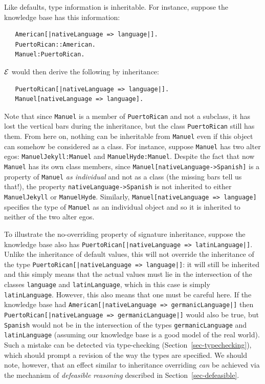 \documentclass[11pt]{article}
\newcommand{\ERGO}{\mbox{\ensuremath{\cal{E}}\smaller{{\sc{RGO}}}}\xspace}
\newcommand{\FLSYSTEM}{\ERGO}
\begin{document}
Like defaults,
type information is inheritable. For instance, suppose the knowledge base
has this information:
\begin{verbatim}
   American[|nativeLanguage => language|].
   PuertoRican::American.
   Manuel:PuertoRican.
\end{verbatim}
\FLSYSTEM would then derive the following by inheritance:
\begin{verbatim}
   PuertoRican[|nativeLanguage => language|].
   Manuel[nativeLanguage => language].
\end{verbatim}
Note that since \texttt{Manuel} is a member of \texttt{PuertoRican} and not
a subclass, it has lost the vertical bars during the inheritance, but the class
\texttt{PuertoRican} still has them.  From here on,
nothing can be inheritable from \texttt{Manuel} even if this object can somehow
be considered as a class. For instance, suppose \texttt{Manuel} has
two alter egos:  \texttt{ManuelJekyll:Manuel} and
\texttt{ManuelHyde:Manuel}. Despite the fact that now \texttt{Manuel}
has its own class members, since
\texttt{Manuel[nativeLanguage->Spanish]} is a property of \texttt{Manuel}
\emph{as individual} and not as a class (the missing bars tell us that!),
the property \texttt{nativeLanguage->Spanish}
is not inherited to either \texttt{ManuelJekyll} or \texttt{ManuelHyde}.
Similarly, \texttt{Manuel[nativeLanguage => language]} specifies the type
of \texttt{Manuel}  as an individual object and so it is inherited to
neither of the two alter egos.  

To illustrate the no-overriding property of signature inheritance, suppose
the knowledge base also has \texttt{PuertoRican[|nativeLanguage =>
  latinLanguage|]}. Unlike the inheritance of default values, this will not
override the inheritance of the type
\texttt{PuertoRican[|nativeLanguage => language|]}: it will still be
inherited and this simply means that
the actual values must lie in the intersection of the classes
\texttt{language} and \texttt{latinLanguage}, which in this case is simply
\texttt{latinLanguage}. However, this also means that one must be careful
here. If the knowledge base had
\texttt{American[|nativeLanguage => germanicLanguage|]} then
\texttt{PuertoRican[|nativeLanguage => germanicLanguage|]} would also be
true, but \texttt{Spanish} would not be in the intersection of
the types \texttt{germanicLanguage} and \texttt{latinLanguage} (assuming
our knowledge base is a good model of the real world).   
Such a mistake can be detected via type-checking
(Section~\ref{sec-typechecking}), which should prompt a revision of the way
the types are specified.
We should note, however, that an effect similar to inheritance overriding
\emph{can} be achieved via the mechanism of \emph{defeasible reasoning}    
described in Section~\ref{sec-defeasible}.
\end{document}
